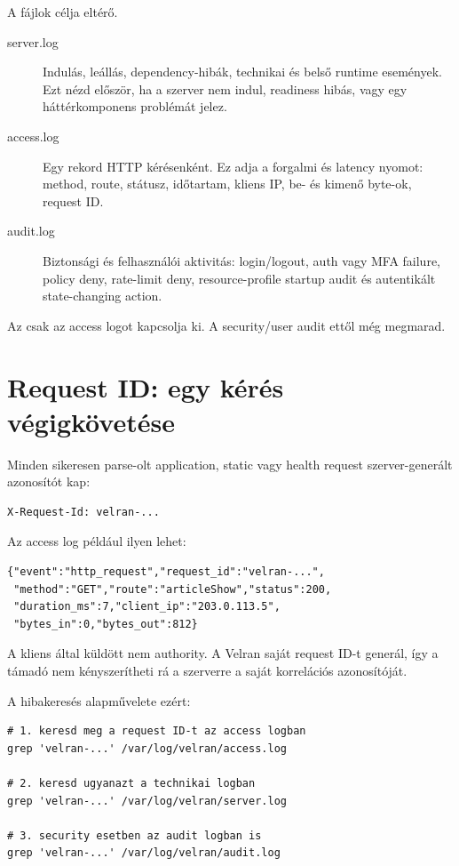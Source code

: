 A fájlok célja eltérő.

\begin{description}
  \item[server.log] Indulás, leállás, dependency-hibák, technikai és belső runtime események. Ezt nézd először, ha a szerver nem indul, readiness hibás, vagy egy háttérkomponens problémát jelez.
  \item[access.log] Egy rekord HTTP kérésenként. Ez adja a forgalmi és latency nyomot: method, route, státusz, időtartam, kliens IP, be- és kimenő byte-ok, request ID.
  \item[audit.log] Biztonsági és felhasználói aktivitás: login/logout, auth vagy MFA failure, policy deny, rate-limit deny, resource-profile startup audit és autentikált state-changing action.
\end{description}

Az  csak az access logot kapcsolja ki. A security/user audit ettől még megmarad.

\section{Request ID: egy kérés végigkövetése}

Minden sikeresen parse-olt application, static vagy health request szerver-generált azonosítót kap:

\begin{lstlisting}
X-Request-Id: velran-...
\end{lstlisting}

Az access log például ilyen lehet:

\begin{lstlisting}
{"event":"http_request","request_id":"velran-...",
 "method":"GET","route":"articleShow","status":200,
 "duration_ms":7,"client_ip":"203.0.113.5",
 "bytes_in":0,"bytes_out":812}
\end{lstlisting}

A kliens által küldött  nem authority. A Velran saját request ID-t generál, így a támadó nem kényszerítheti rá a szerverre a saját korrelációs azonosítóját.

A hibakeresés alapművelete ezért:

\begin{lstlisting}
# 1. keresd meg a request ID-t az access logban
grep 'velran-...' /var/log/velran/access.log

# 2. keresd ugyanazt a technikai logban
grep 'velran-...' /var/log/velran/server.log

# 3. security esetben az audit logban is
grep 'velran-...' /var/log/velran/audit.log
\end{lstlisting}


